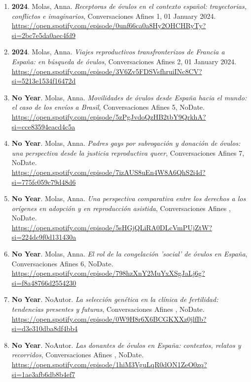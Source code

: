 \begin{enumerate}
\item {\bf 2024}. Molas, Anna. {\it Receptoras de óvulos en el contexto español: trayectorias, conflictos e imaginarios}, Conversaciones Afines 1, 01 January 2024. \\ \url{ https://open.spotify.com/episode/0unf66ca0a8Hy2OHCHRyTy?si=2bc7e5da0aec4fd9 }\filbreak
\item {\bf 2024}. Molas, Anna. {\it Viajes reproductivos transfronterizos de Francia a España: en búsqueda de óvulos}, Conversaciones Afines 2, 01 January 2024. \\ \url{ https://open.spotify.com/episode/3V6Zv5FDSVsfhruiINc8CV?si=5213e1534f16472d }\filbreak
\item {\bf No Year}. Molas, Anna. {\it Movilidades de óvulos desde España hacia el mundo: el caso de los envíos a Brasil}, Conversaciones Afines 5, NoDate. \\ \url{ https://open.spotify.com/episode/5zPgJvdoQzHB2tbY9QrkhA?si=cce83594eacd4c5a }\filbreak
\item {\bf No Year}. Molas, Anna. {\it Padres gays por subrogación y donación de óvulos: una perspectiva desde la justicia reproductiva queer}, Conversaciones Afines 7, NoDate. \\ \url{ https://open.spotify.com/episode/7izAUS8uEn4W8A6QhS2i4d?si=775fc059c79d48d6 }\filbreak
\item {\bf No Year}. Molas, Anna. {\it Una perspectiva comparativa entre los derechos a los orígenes en adopción y en reproducción asistida}, Conversaciones Afines , NoDate. \\ \url{ https://open.spotify.com/episode/5sHGjQLiRA0DLcVmPUjZtW?si=224dc9f0d131430a }\filbreak
\item {\bf No Year}. Molas, Anna. {\it El rol de la congelación 'social' de óvulos en España}, Conversaciones Afines 6, NoDate. \\ \url{ https://open.spotify.com/episode/798hzXnY2MuYxXSgJaLj6g?si=f8a48766d2554230 }\filbreak
\item {\bf No Year}. NoAutor. {\it La selección genética en la clínica de fertilidad: tendencias presentes y futuras}, Conversaciones Afines , NoDate. \\ \url{ https://open.spotify.com/episode/0W9H8r6X6BCGKXXz0jlfIb?si=d3e310dba8df4bb4 }\filbreak
\item {\bf No Year}. NoAutor. {\it Las donantes de óvulos en España: contextos, relatos y recorridos}, Conversaciones Afines , NoDate. \\ \url{ https://open.spotify.com/episode/1hiM3VguLqR0dON1ZeO0zq?si=1ae3afb6db8b4ef7 }\filbreak
\end{enumerate} 

